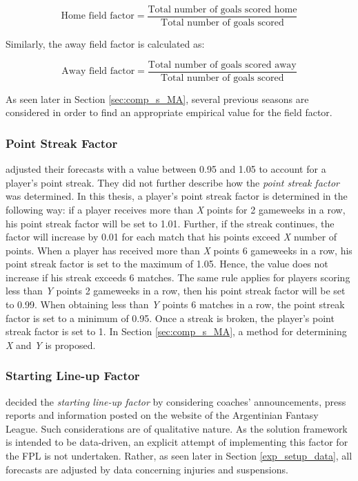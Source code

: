 \begin{equation*}
    \textrm{Home field factor} = \frac{\textrm{Total number of goals scored home}}{\textrm{Total number of goals scored}} 
\end{equation*}

Similarly, the away field factor is calculated as:

\begin{equation*}
    \textrm{Away field factor} = \frac{\textrm{Total number of goals scored away}}{\textrm{Total number of goals scored}}
\end{equation*}

As seen later in Section \ref{sec:comp_s_MA}, several previous seasons are considered in order to find an appropriate empirical value for the field factor.


\subsubsection{Point Streak Factor}

\cite{Bonomo} adjusted their forecasts with a value between 0.95 and 1.05 to account for a player's point streak. They did not further describe how the \textit{point streak factor} was determined. In this thesis, a player's point streak factor is determined in the following way: if a player receives more than \textit{X} points for 2 gameweeks in a row, his point streak factor will be set to 1.01. Further, if the streak continues, the factor will increase by 0.01 for each match that his points exceed \textit{X} number of points. When a player has received more than \textit{X} points 6 gameweeks in a row, his point streak factor is set to the maximum of 1.05. Hence, the value does not increase if his streak exceeds 6 matches. The same rule applies for players scoring less than \textit{Y} points 2 gameweeks in a row, then his point streak factor will be set to 0.99. When obtaining less than \textit{Y} points 6 matches in a row, the point streak factor is set to a minimum of 0.95. Once a streak is broken, the player's point streak factor is set to 1. In Section \ref{sec:comp_s_MA}, a method for determining \textit{X} and \textit{Y} is proposed.

\subsubsection{Starting Line-up Factor}

\cite{Bonomo} decided the \textit{starting line-up factor} by considering coaches' announcements, press reports and information posted on the website of the Argentinian Fantasy League. Such considerations are of qualitative nature. As the solution framework is intended to be data-driven, an explicit attempt of implementing this factor for the FPL is not undertaken. Rather, as seen later in Section \ref{exp_setup_data}, all forecasts are adjusted by data concerning injuries and suspensions.

